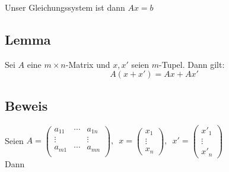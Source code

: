 Unser Gleichungssystem ist dann \(Ax=b\)

\subsection{Lemma}
Sei \(A\) eine \(m \times n\)-Matrix und \(x,x'\) seien \(m\)-Tupel. Dann gilt:
\[
A(x+x')= Ax + Ax'
\]

\subsection{Beweis}
Seien \( A= 
\begin{pmatrix}
a_{11} & \cdots &  a_{1n} \\
 \vdots & & \vdots \\ 
a_{m1} & \cdots &  a_{mn} \\
\end{pmatrix}
, \enspace
x= 
\begin{pmatrix}
x_1 \\ \vdots \\ x_n
\end{pmatrix}
, \enspace
x'= \begin{pmatrix}
x'_1 \\ \vdots \\ x'_n
\end{pmatrix}
\) 
\\
Dann

